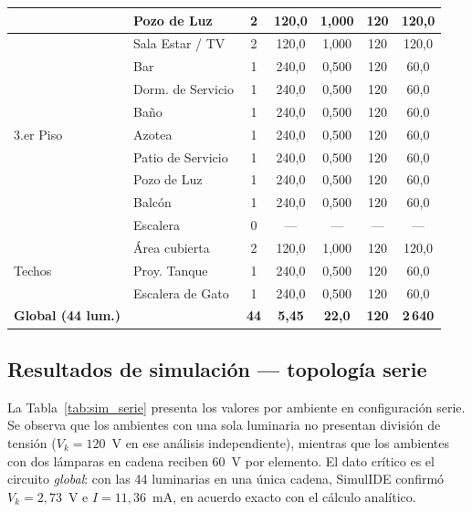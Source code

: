 \begin{table}[H]
\begin{tabular}{llccccc}
 & Pozo de Luz            & 2 & 120{,}0 & 1{,}000 & 120 & 120{,}0 \\
\midrule
\multirow{9}{*}{3.er Piso}
 & Sala Estar / TV        & 2 & 120{,}0 & 1{,}000 & 120 & 120{,}0 \\
 & Bar                    & 1 & 240{,}0 & 0{,}500 & 120 &  60{,}0 \\
 & Dorm. de Servicio      & 1 & 240{,}0 & 0{,}500 & 120 &  60{,}0 \\
 & Baño                   & 1 & 240{,}0 & 0{,}500 & 120 &  60{,}0 \\
 & Azotea                 & 1 & 240{,}0 & 0{,}500 & 120 &  60{,}0 \\
 & Patio de Servicio      & 1 & 240{,}0 & 0{,}500 & 120 &  60{,}0 \\
 & Pozo de Luz            & 1 & 240{,}0 & 0{,}500 & 120 &  60{,}0 \\
 & Balcón                 & 1 & 240{,}0 & 0{,}500 & 120 &  60{,}0 \\
 & Escalera               & 0 &    —    &    —    &  —  &     —   \\
\midrule
\multirow{3}{*}{Techos}
 & Área cubierta          & 2 & 120{,}0 & 1{,}000 & 120 & 120{,}0 \\
 & Proy. Tanque           & 1 & 240{,}0 & 0{,}500 & 120 &  60{,}0 \\
 & Escalera de Gato       & 1 & 240{,}0 & 0{,}500 & 120 &  60{,}0 \\
\midrule
\textbf{Global (44 lum.)} & & \textbf{44} & \textbf{5{,}45} & \textbf{22{,}0} & \textbf{120} & \textbf{2\,640} \\
\bottomrule
\end{tabular}
\end{table}

\subsection{Resultados de simulación — topología serie}

La Tabla~\ref{tab:sim_serie} presenta los valores por ambiente en configuración serie. Se observa que los ambientes con una sola luminaria no presentan división de tensión ($V_k = 120$~V en ese análisis independiente), mientras que los ambientes con dos lámparas en cadena reciben 60~V por elemento. El dato crítico es el circuito \textit{global}: con las 44 luminarias en una única cadena, SimulIDE confirmó $V_k = 2{,}73$~V e $I = 11{,}36$~mA, en acuerdo exacto con el cálculo analítico.

